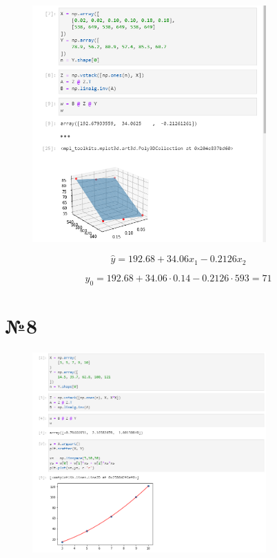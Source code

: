 \documentclass[11pt, a4paper]{article} %
\begin{document}
\begin{figure}[h]
    \centering
    \includegraphics[width=0.8\textwidth]{task7.png}
\end{figure}

$$\hat y = 192.68 + 34.06 x_1 - 0.2126 x_2$$

$$\hat y_0 = 192.68 + 34.06 \cdot 0.14 - 0.2126 \cdot 593 = 71$$

\pagebreak

\section*{№8}

\begin{figure}[h]
    \centering
    \includegraphics[width=0.8\textwidth]{task8.png}
\end{figure}
\end{document}

